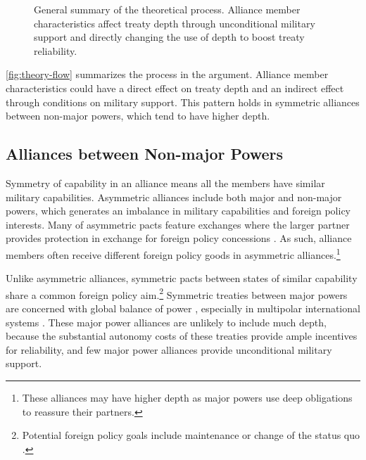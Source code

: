 \documentclass[12pt]{article}
\begin{document}
\begin{figure}
\begin{center}
 \caption{General summary of the theoretical process. Alliance member characteristics affect treaty depth through unconditional military support and directly changing the use of depth to boost treaty reliability.}
  \label{fig:theory-flow}
\end{center} 
\end{figure}


\autoref{fig:theory-flow} summarizes the process in the argument. 
Alliance member characteristics could have a direct effect on treaty depth and an indirect effect through conditions on military support. 
This pattern holds in symmetric alliances between non-major powers, which tend to have higher depth. 


\subsection{Alliances between Non-major Powers}


Symmetry of capability in an alliance means all the members have similar military capabilities. 
Asymmetric alliances include both major and non-major powers, which generates an imbalance in military capabilities and foreign policy interests. 
Many of asymmetric pacts feature exchanges where the larger partner provides protection in exchange for foreign policy concessions \citep{Morrow1991, Johnson2015}. 
As such, alliance members often receive different foreign policy goods in asymmetric alliances.\footnote{These alliances may have higher depth as major powers use deep obligations to reassure their partners.} 


Unlike asymmetric alliances, symmetric pacts between states of similar capability share a common foreign policy aim.\footnote{Potential foreign policy goals include maintenance or change of the status quo \citep{MorganPalmer2006}.} 
Symmetric treaties between major powers are concerned with global balance of power \citep{Walt1990}, especially in multipolar international systems \citep{Snyder1984, Snyder1990, ChristensenSnyder1990}. 
These major power alliances are unlikely to include much depth, because the substantial autonomy costs of these treaties provide ample incentives for reliability, and few major power alliances provide unconditional military support.
\end{document}
